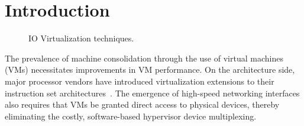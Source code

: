 \section{Introduction}
\label{sec:intro}

\begin{figure}[ht!]
  \centering
    \hfill
    \hfill
    \caption{IO Virtualization techniques.
      \label{fig:storage}}
    
\end{figure}

The prevalence of machine consolidation through the use of virtual machines (VMs) necessitates improvements in VM performance. On the architecture side, major processor vendors have introduced virtualization extensions to their instruction set architectures~\cite{popek1974formal,intel,armv8}.
The emergence of high-speed networking interfaces also requires that VMs be granted direct access to  physical devices, thereby eliminating the costly, software-based hypervisor device multiplexing.

